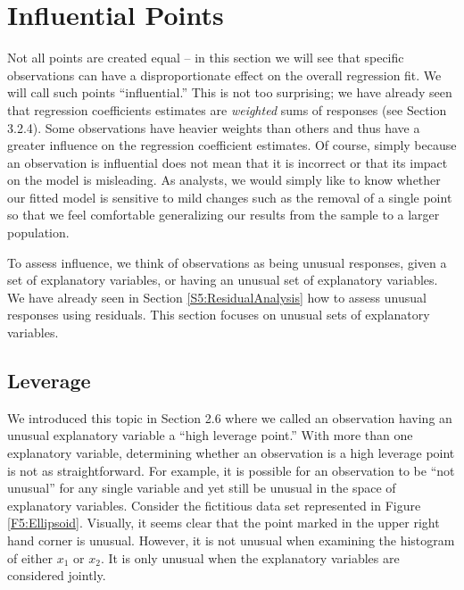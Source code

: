 \linejed

\section{Influential Points}

Not all points are created equal -- in this section we will see that
specific observations can have a disproportionate effect on the
overall regression fit. We will call such points ``influential.''
This is not too surprising; we have already seen that regression
coefficients estimates are \emph{weighted} sums of responses (see
Section 3.2.4). Some observations have heavier weights than others
and thus have a greater influence on the regression coefficient
estimates. Of course, simply because an observation is influential
does not mean that it is incorrect or that its impact on the model
is misleading. As analysts, we would simply like to know whether our
fitted model is sensitive to mild changes such as the removal of a
single point so that we feel comfortable generalizing our results
from the sample to a larger population.

To assess influence, we think of observations as being unusual
responses, given a set of explanatory variables, or having an
unusual set of explanatory variables. We have already seen in
Section \ref{S5:ResidualAnalysis} how to assess unusual responses
using residuals. This section focuses on unusual sets of explanatory
variables.


\subsection{Leverage}\label{S5:Leverage}

We introduced this topic in Section 2.6 where we called an
observation having an unusual explanatory variable a ``high leverage
point.'' With more than one explanatory variable, determining
whether an observation is a high leverage point is not as
straightforward. For example, it is possible for an observation to
be ``not unusual'' for any single variable and yet still be unusual
in the space of explanatory variables. Consider the fictitious data
set represented in Figure \ref{F5:Ellipsoid}. Visually, it seems
clear that the point marked in the upper right hand corner is
unusual. However, it is not unusual when examining the histogram of
either $x_1$ or $x_2$. It is only unusual when the explanatory
variables are considered jointly.



